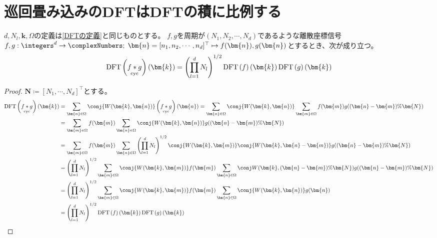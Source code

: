 		\section{巡回畳み込みのDFTはDFTの積に比例する}
			\begin{shadebox}
				$d,N_l,\bm{k},\Omega$の定義は\ref{DFTの定義}と同じものとする。
				$f,g$を周期が$(N_1,N_2,\cdots,N_d)$であるような離散座標信号$f,g: \integers^d\to\complexNumbers;\;\bm{n} = [n_1,n_2,\cdots,n_d]^\top \mapsto f(\bm{n}),g(\bm{n})$とするとき、次が成り立つ。
				\[ \DFTwithArg{\cycConv{f}{g}}{\bm{k}} = \left(\prod_{l=1}^d N_l\right)^{1/2}\DFTwithArg{f}{\bm{k}}\DFTwithArg{g}{\bm{k}} \]
			\end{shadebox}
			\begin{proof}
				\quad\par
				$\bm{N} \coloneqq [N_1,\cdots,N_d]^\top$とする。
				\begin{align*}
					\DFTwithArg{\cycConv{f}{g}}{\bm{k}} &= \sum_{\bm{n}\in\Omega}\conj{W(\bm{k},\bm{n})} \left(\cycConv{f}{g}\right)(\bm{n}) = \sum_{\bm{n}\in\Omega}\conj{W(\bm{k},\bm{n})} \sum_{\bm{m}\in\Omega} f(\bm{m})g((\bm{n}-\bm{m})\%\bm{N}) \\
					&= \sum_{\bm{m}\in\Omega} f(\bm{m}) \sum_{\bm{n}\in\Omega} \conj{W(\bm{k},\bm{n})}g((\bm{n}-\bm{m})\%\bm{N}) \\
					&= \sum_{\bm{m}\in\Omega} f(\bm{m}) \sum_{\bm{n}\in\Omega} \left(\prod_{l=1}^d N_l\right)^{1/2} \conj{W(\bm{k},\bm{m})} \conj{W(\bm{k},\bm{n}-\bm{m})} g((\bm{n}-\bm{m})\%\bm{N}) \\
					&= \left(\prod_{l=1}^d N_l\right)^{1/2} \sum_{\bm{m}\in\Omega} \conj{W(\bm{k},\bm{m})}f(\bm{m}) \sum_{\bm{n}\in\Omega} \conj{W(\bm{k},(\bm{n}-\bm{m})\%\bm{N})} g((\bm{n}-\bm{m})\%\bm{N}) \\
					&= \left(\prod_{l=1}^d N_l\right)^{1/2} \sum_{\bm{m}\in\Omega} \conj{W(\bm{k},\bm{m})}f(\bm{m}) \sum_{\bm{n}\in\Omega} \conj{W(\bm{k},\bm{n})} g(\bm{n}) \\
					&= \left(\prod_{l=1}^d N_l\right)^{1/2}\DFTwithArg{f}{\bm{k}}\DFTwithArg{g}{\bm{k}}
				\end{align*}
			\end{proof}

